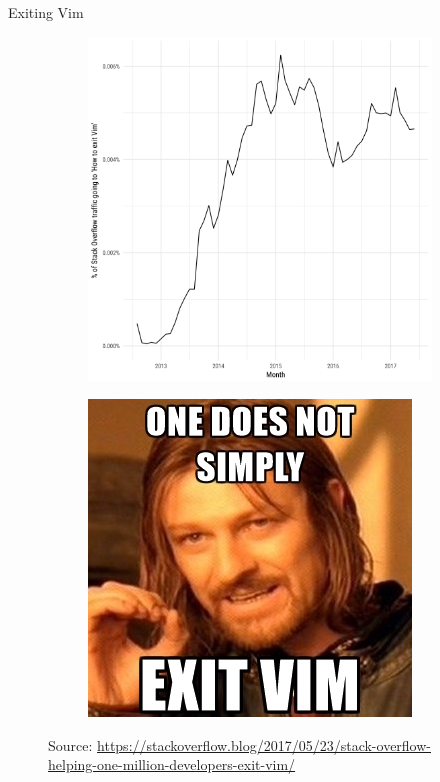 \documentclass{beamer}
\begin{document}
\begin{frame}{Exiting Vim}
\begin{figure}
\centering
\begin{subfigure}{.5\textwidth}
  \centering
  \includegraphics[width=.9\linewidth]{exiting_vim.png}
\end{subfigure}%
\begin{subfigure}{.5\textwidth}
  \centering
  \includegraphics[width=.9\linewidth]{vim_meme.jpeg}
\end{subfigure}
\caption{Source: \url{https://stackoverflow.blog/2017/05/23/stack-overflow-helping-one-million-developers-exit-vim/}}
\end{figure}
\end{frame}
\end{document}
